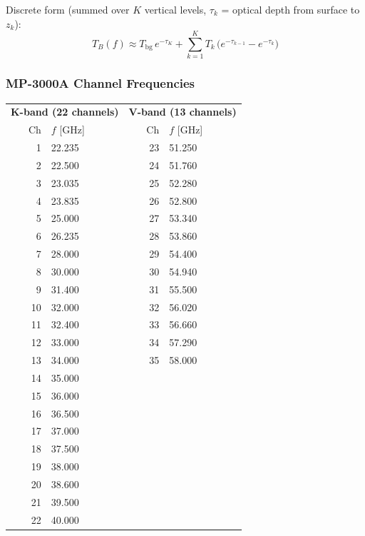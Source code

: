 \documentclass[11pt,letterpaper]{article}
\begin{document}
Discrete form (summed over $K$ vertical levels, $\tau_k$ = optical depth from surface to $z_k$):
\begin{equation}
  T_B(f) \approx T_\mathrm{bg}\,e^{-\tau_K}
  + \sum_{k=1}^{K} T_k\,\bigl(e^{-\tau_{k-1}} - e^{-\tau_k}\bigr)
\end{equation}

\subsubsection{MP-3000A Channel Frequencies}

\begin{center}
\begin{tabular}{rl|rl}
\toprule
\multicolumn{2}{c|}{\textbf{K-band (22 channels)}} &
\multicolumn{2}{c}{\textbf{V-band (13 channels)}} \\
Ch & $f$ [GHz] & Ch & $f$ [GHz] \\
\midrule
1  & 22.235 & 23 & 51.250 \\
2  & 22.500 & 24 & 51.760 \\
3  & 23.035 & 25 & 52.280 \\
4  & 23.835 & 26 & 52.800 \\
5  & 25.000 & 27 & 53.340 \\
6  & 26.235 & 28 & 53.860 \\
7  & 28.000 & 29 & 54.400 \\
8  & 30.000 & 30 & 54.940 \\
9  & 31.400 & 31 & 55.500 \\
10 & 32.000 & 32 & 56.020 \\
11 & 32.400 & 33 & 56.660 \\
12 & 33.000 & 34 & 57.290 \\
13 & 34.000 & 35 & 58.000 \\
14 & 35.000 & & \\
15 & 36.000 & & \\
16 & 36.500 & & \\
17 & 37.000 & & \\
18 & 37.500 & & \\
19 & 38.000 & & \\
20 & 38.600 & & \\
21 & 39.500 & & \\
22 & 40.000 & & \\
\bottomrule
\end{tabular}
\end{center}

\end{document}
